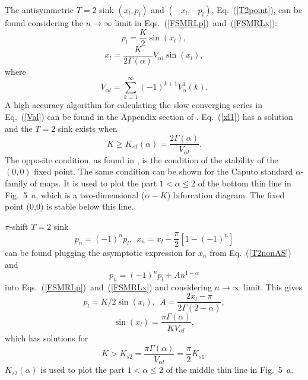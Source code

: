 \documentclass[graybox]{svmult}
\begin{document}
The antisymmetric $T=2$ sink $(x_l,p_l)$ and $(-x_l,-p_l)$,  Eq.~(\ref{T2point}), can be found considering the $n \rightarrow \infty$ limit in  Eqs.~(\ref{FSMRLp})~and~(\ref{FSMRLx}):
\begin{equation} \label{RLplim} 
p_l = \frac{K}{2} \sin(x_l),
\end{equation}
\begin{equation}\label{xl1} 
x_l = \frac{K}{2 \Gamma(\alpha)} V_{\alpha l} \sin(x_l),
\end{equation}
where
\begin{equation} \label{Val} 
 V_{\alpha l}  =  \sum_{k=1}^{\infty} (-1)^{k+1} V_{\alpha}^1(k).
\end{equation}
A high accuracy algorithm for calculating the slow converging series in Eq.~(\ref{Val}) can be found in the Appendix section of
\cite{ME4}.
Eq.~(\ref{xl1}) has a solution and the $T=2$ sink exists when    
\begin{equation} \label{Kcr1} 
K \ge K_{s1}(\alpha) = \frac{2 \Gamma(\alpha)}{V_{\alpha l}}.
\end{equation}
The opposite condition, as found in \cite{ME1}, is the condition of the stability of the $(0,0)$ fixed point. The same condition can be shown for the Caputo standard $\alpha$-family of maps. It is used to plot the part $1<\alpha \le2$ of the bottom thin line in 
Fig.~5~$a$,
which is a two-dimensional ($\alpha-K$) bifurcation diagram. The fixed point (0,0) is stable below this line.   

$\pi$-shift $T=2$ sink 
\begin{equation} \label{T2nonAS} 
p_{n} = (-1)^np_l, \    \  x_{n} = x_l-\frac{\pi}{2}[1-(-1)^n]
\end{equation}
can be found plugging the asymptotic expression for $x_n$ from Eq.~(\ref{T2nonAS}) and
\begin{equation} \label{T2nonLimAS} 
p_{n} = (-1)^np_l+An^{1-\alpha}
\end{equation}
into Eqs.~(\ref{FSMRLp})~and~(\ref{FSMRLx}) and considering 
$n \rightarrow \infty$ limit.
This gives
\begin{equation} \label{T2nonASA} 
 p_l = K/2 \sin(x_l), \    \ A= \frac{2 x_l-\pi}{2 \Gamma(2-\alpha)}, 
\end{equation}
\begin{equation} \label{T2nonASxsol} 
\sin(x_l)= \frac{\pi \Gamma(\alpha)}{K V_{\alpha l}}, 
\end{equation}
which has solutions for 
\begin{equation} \label{T2nonASKc} 
K>K_{s2}= \frac{\pi \Gamma(\alpha)}{V_{\alpha l}}=\frac{\pi}{2}K_{s1}. 
\end{equation}
$K_{s2}(\alpha)$ is used to plot the part $1<\alpha \le2$ of the middle thin line in 
Fig.~5~$a$. 
\end{document}
